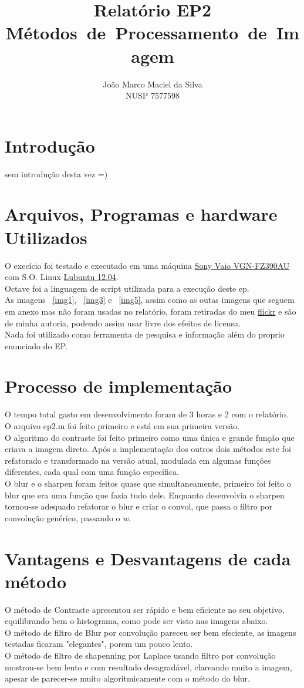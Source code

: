 \documentclass[11pt,a4paper]{article}
\author{João Marco Maciel da Silva\\NUSP 7577598}
\title{Relatório EP2\\Métodos~de~Processamento~de~Imagem}
\begin{document}
\maketitle
\section{Introdução}
sem introdução desta vez =)

\section{Arquivos, Programas e hardware Utilizados}
O execício foi testado e executado em uma máquina \href{http://esupport.sony.com/BR/p/model-home.pl?mdl=VGNFZ390AU&LOC=3#/manualsTab}{Sony Vaio VGN-FZ390AU}
com S.O. Linux \href{http://lubuntu.net/}{Lubuntu 12.04}.\\
Octave foi a linguagem de script utilizada para a execução deste ep.\\
As imagens ~\ref{img1}, ~\ref{img3} e ~\ref{img5}, assim como as outas imagens que seguem em anexo mas não foram usadas no relatório,
foram retiradas do meu \href{http://www.flickr.com/ordinario}{flickr} e
são de minha autoria, podendo assim usar livre dos efeitos de licensa.\\
Nada foi utilizado como ferramenta de pesquisa e informação além do proprio enunciado do EP.

\section{Processo de implementação}
O tempo total gasto em desenvolvimento foram de 3 horas e 2 com o relatório.\\
O arquivo ep2.m foi feito primeiro e está em sua primeira versão.\\
O algoritmo do contraste foi feito primeiro como uma única e grande função que criava a imagem direto. Após a implementação dos outros dois métodos
este foi refatorado e transformado na versão atual, modulada em algumas funções diferentes, cada qual com uma função específica.\\
O blur e o sharpen foram feitos quase que simultaneamente, primeiro foi feito o blur que era uma função que fazia tudo dele. Enquanto
desenvolvia o sharpen tornou-se adequado refatorar o blur e criar o convol, que passa o filtro por convolução genérico, passando o \textit{w}.\\

\section{Vantagens e Desvantagens de cada método}
O método de Contraste apresentou ser rápido e bem eficiente no seu objetivo, equilibrando bem o histograma, como pode ser visto nas imagens abaixo.\\
O método de filtro de Blur por convolução pareceu ser bem efeciente, as imagens testadas ficaram "elegantes", porem um pouco lento.\\
O método de filtro de shapenning por Laplace usando filtro por convolução mostrou-se bem lento e com resultado desagradável, clareando muito a imagem,
apesar de parecer-se muito algoritmicamente com o método do blur.
\end{document}
